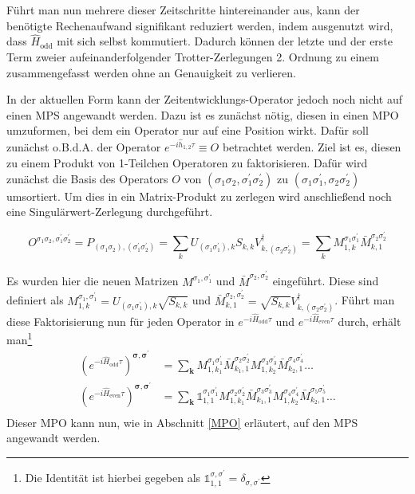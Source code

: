 \documentclass[10pt,a4paper]{report}
\begin{document}
Führt man nun mehrere dieser Zeitschritte hintereinander aus, kann der benötigte Rechenaufwand signifikant reduziert werden, indem ausgenutzt wird, dass $\hat{H}_{\text{odd}}$ mit sich selbst kommutiert. Dadurch können der letzte und der erste Term zweier aufeinanderfolgender Trotter-Zerlegungen 2. Ordnung zu einem zusammengefasst werden ohne an Genauigkeit zu verlieren.\par

In der aktuellen Form kann der Zeitentwicklungs-Operator jedoch noch nicht auf einen MPS angewandt werden. Dazu ist es zunächst nötig, diesen in einen MPO umzuformen, bei dem ein Operator nur auf eine Position wirkt. Dafür soll zunächst o.B.d.A. der Operator $e^{-i\hat{h}_{1,2}\tau}\equiv O$ betrachtet werden. Ziel ist es, diesen zu einem Produkt von 1-Teilchen Operatoren zu faktorisieren. Dafür wird zunächst die Basis des Operators $O$ von $(\sigma_1\sigma_2,\sigma_1^{\prime}\sigma_2^{\prime})$ zu $(\sigma_1\sigma_1^{\prime},\sigma_2\sigma_2^{\prime})$ umsortiert. Um dies in ein Matrix-Produkt zu zerlegen wird anschließend noch eine Singulärwert-Zerlegung durchgeführt. 

\begin{equation}
O^{\sigma_1 \sigma_2,\sigma_1^\prime \sigma_2^\prime}=P_{(\sigma_1 \sigma_2),(\sigma_1^\prime \sigma_2^\prime)}=\sum_k U_{(\sigma_1 \sigma_1^\prime),k}S_{k,k}V_{k,(\sigma_2 \sigma_2^\prime)}^\dagger=\sum_k M_{1,k}^{\sigma_1 \sigma_1^\prime} \bar{M}_{k,1}^{\sigma_2 \sigma_2^\prime}
\end{equation}

Es wurden hier die neuen Matrizen $M^{\sigma_1,\sigma_1^{\prime}}$ und $\bar{M}^{\sigma_2,\sigma_2^{\prime}}$ eingeführt. Diese sind definiert als $M_{1,k}^{\sigma_1,\sigma_1^{\prime}}=U_{(\sigma_1 \sigma_1^\prime),k}\sqrt{S_{k,k}}$ und $\bar{M}_{k,1}^{\sigma_2,\sigma_2^{\prime}}=\sqrt{S_{k,k}}V_{k,(\sigma_2 \sigma_2^\prime)}^\dagger$. Führt man diese Faktorisierung nun für jeden Operator in $e^{-i\hat{H}_{\text{odd}}\tau}$ und $e^{-i\hat{H}_{\text{even}}\tau}$ durch, erhält man\footnote{Die Identität ist hierbei gegeben als $\mathbb{1}_{1,1}^{\sigma,\sigma^{\prime}}=\delta_{\sigma,\sigma^{\prime}}$}
\begin{equation}
\begin{split}
(e^{-i\hat{H}_{\text{odd}}\tau})^{\bm{\sigma},\bm{\sigma^\prime}}&=\sum_{\textbf{k}}M_{1,k_1}^{\sigma_1 \sigma_1^\prime} \bar{M}_{k_1,1}^{\sigma_2 \sigma_2^\prime}M_{1,k_2}^{\sigma_3 \sigma_3^\prime} \bar{M}_{k_2,1}^{\sigma_4 \sigma_4^\prime}\ldots\\
(e^{-i\hat{H}_{\text{even}}\tau})^{\bm{\sigma},\bm{\sigma^\prime}}&=\sum_{\textbf{k}}\mathbb{1}_{1,1}^{\sigma_1 \sigma_1^\prime} M_{1,k_1}^{\sigma_2 \sigma_2^\prime}\bar{M}_{k_1,1}^{\sigma_3 \sigma_3^\prime} M_{1,k_2}^{\sigma_4 \sigma_4^\prime}\bar{M}_{k_2,1}^{\sigma_5 \sigma_5^\prime}\ldots\\
\end{split}
\end{equation}
Dieser MPO kann nun, wie in Abschnitt \ref{MPO} erläutert, auf den MPS angewandt werden.
\end{document}
